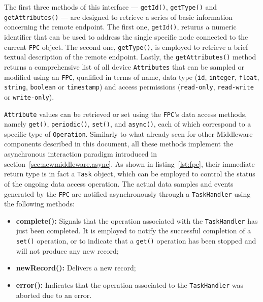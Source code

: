 The first three methods of this interface --- \texttt{getId()},
\texttt{getType()} and \texttt{getAttributes()} --- are designed to retrieve a
series of basic information concerning the remote endpoint. The first one,
\texttt{getId()}, returns a numeric identifier that can be used to address the
single specific node connected to the current \texttt{FPC} object. The second
one, \texttt{getType()}, is employed to retrieve a brief textual description of
the remote endpoint. Lastly, the \texttt{getAttributes()} method returns a
comprehensive list of all device \texttt{Attributes} that can be sampled or
modified using an \texttt{FPC}, qualified in terms of name, data type
(\texttt{id}, \texttt{integer}, \texttt{float}, \texttt{string},
\texttt{boolean} or \texttt{timestamp}) and access permissions
(\texttt{read-only}, \texttt{read-write} or \texttt{write-only}).

\texttt{Attribute} values can be retrieved or set using the \texttt{FPC}'s data
access methods, namely \texttt{get()}, \texttt{periodic()}, \texttt{set()}, and
\texttt{async()}, each of which correspond to a specific type of
\texttt{Operation}. Similarly to what already seen for other Middleware
components described in this document, all these methods implement the
asynchronous interaction paradigm introduced in
section~\ref{sec:newmiddleware.async}. As shown in listing~\ref{lst:fpc}, their
immediate return type is in fact a \texttt{Task} object, which can be employed
to control the status of the ongoing data access operation. The actual data
samples and events generated by the \texttt{FPC} are notified asynchronously
through a \texttt{TaskHandler} using the following methods:

\begin{itemize}

    \item \textbf{complete():} Signals that the operation associated with the
        \texttt{TaskHandler} has just been completed. It is employed to notify
        the successful completion of a \texttt{set()} operation, or to indicate
        that a \texttt{get()} operation has been stopped and will not produce
        any new record;

    \item \textbf{newRecord():} Delivers a new record;

    \item \textbf{error():} Indicates that the operation associated to the
        \texttt{TaskHandler} was aborted due to an error.
\end{itemize}

